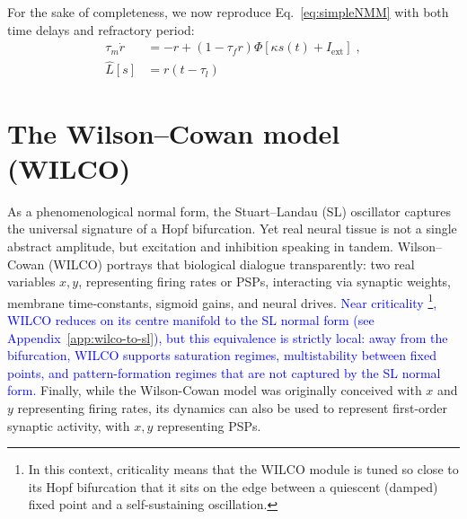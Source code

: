 \documentclass[12pt]{article}
\numberwithin{equation}{section}
\newcommand{\rev}[1]{\textcolor{blue}{#1}}
\begin{document}
For the sake of completeness, we now  reproduce Eq.~\eqref{eq:simpleNMM}
with both time delays and refractory period:
\begin{equation}\label{eq:simpleNMMwithdelays}
\begin{aligned}
\tau_m \dot r &= -r + (1-\tau_{f}r)\Phi[\kappa s(t) +  I_\text{ext}] \;,\\
 \hat L[s]&=  r(t-\tau_l) 
 \end{aligned}
\end{equation}
 
\clearpage\section{The Wilson–Cowan model (WILCO)} \label{sec:WILCO}

\begin{tcolorbox}[colback=gray!6,colframe=gray!6,enlarge left by=0mm, boxrule=0pt, enhanced, sharp corners]
As a phenomenological normal form, the Stuart–Landau (SL) oscillator captures the universal signature of a Hopf bifurcation.  Yet real neural tissue is not a single abstract amplitude, but excitation and inhibition speaking in tandem.  Wilson–Cowan (WILCO) portrays that biological dialogue transparently: two real variables \(x,y\), representing firing rates or PSPs, interacting via synaptic weights, membrane time‑constants, sigmoid gains, and neural drives.  
\rev{Near criticality \footnote{In this context, criticality means that the WILCO module is tuned so close to its Hopf bifurcation that it sits on the edge between a quiescent (damped) fixed point and a self-sustaining oscillation.}, WILCO reduces on its centre manifold to the SL normal form (see Appendix~\ref{app:wilco-to-sl}), but this equivalence is strictly local: away from the bifurcation, WILCO supports saturation regimes, multistability between fixed points, and pattern-formation regimes that are not captured by the SL normal form.} Finally, while the Wilson-Cowan model was originally conceived with $x$ and $y$ representing firing rates, its dynamics can also be used to represent first-order synaptic activity, with $x,y$ representing PSPs.  

\end{tcolorbox}
\end{document}
